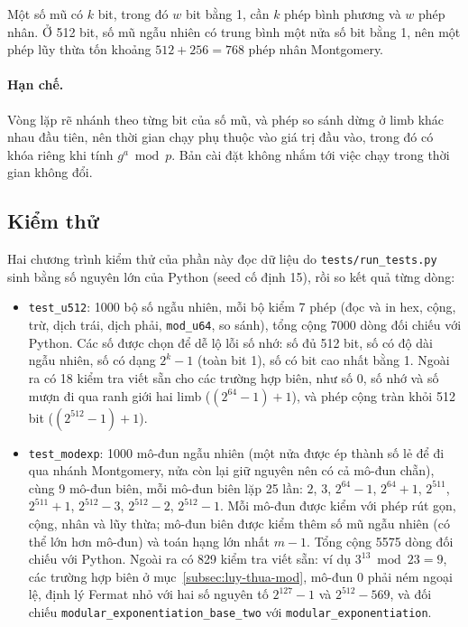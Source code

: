 Một số mũ có $k$ bit, trong đó $w$ bit bằng 1, cần $k$ phép bình phương và $w$ phép nhân. Ở 512 bit, số mũ ngẫu nhiên có trung bình một nửa số bit bằng 1, nên một phép lũy thừa tốn khoảng $512 + 256 = 768$ phép nhân Montgomery.

\paragraph{Hạn chế.} Vòng lặp rẽ nhánh theo từng bit của số mũ, và phép so sánh dừng ở limb khác nhau đầu tiên, nên thời gian chạy phụ thuộc vào giá trị đầu vào, trong đó có khóa riêng khi tính $g^a \bmod p$. Bản cài đặt không nhắm tới việc chạy trong thời gian không đổi.

\subsection{Kiểm thử}
\label{subsec:kiem-thu-so-lon}

Hai chương trình kiểm thử của phần này đọc dữ liệu do \texttt{tests/run\_tests.py} sinh bằng số nguyên lớn của Python (seed cố định 15), rồi so kết quả từng dòng:
\begin{itemize}
    \item \texttt{test\_u512}: 1000 bộ số ngẫu nhiên, mỗi bộ kiểm 7 phép (đọc và in hex, cộng, trừ, dịch trái, dịch phải, \texttt{mod\_u64}, so sánh), tổng cộng 7000 dòng đối chiếu với Python. Các số được chọn để dễ lộ lỗi số nhớ: số đủ 512 bit, số có độ dài ngẫu nhiên, số có dạng $2^k - 1$ (toàn bit 1), số có bit cao nhất bằng 1. Ngoài ra có 18 kiểm tra viết sẵn cho các trường hợp biên, như số 0, số nhớ và số mượn đi qua ranh giới hai limb ($(2^{64} - 1) + 1$), và phép cộng tràn khỏi 512 bit ($(2^{512} - 1) + 1$).
    \item \texttt{test\_modexp}: 1000 mô-đun ngẫu nhiên (một nửa được ép thành số lẻ để đi qua nhánh Montgomery, nửa còn lại giữ nguyên nên có cả mô-đun chẵn), cùng 9 mô-đun biên, mỗi mô-đun biên lặp 25 lần: $2$, $3$, $2^{64} - 1$, $2^{64} + 1$, $2^{511}$, $2^{511} + 1$, $2^{512} - 3$, $2^{512} - 2$, $2^{512} - 1$. Mỗi mô-đun được kiểm với phép rút gọn, cộng, nhân và lũy thừa; mô-đun biên được kiểm thêm số mũ ngẫu nhiên (có thể lớn hơn mô-đun) và toán hạng lớn nhất $m - 1$. Tổng cộng 5575 dòng đối chiếu với Python. Ngoài ra có 829 kiểm tra viết sẵn: ví dụ $3^{13} \bmod 23 = 9$, các trường hợp biên ở mục~\ref{subsec:luy-thua-mod}, mô-đun 0 phải ném ngoại lệ, định lý Fermat nhỏ với hai số nguyên tố $2^{127} - 1$ và $2^{512} - 569$, và đối chiếu \texttt{modular\_\allowbreak{}exponentiation\_\allowbreak{}base\_\allowbreak{}two} với \texttt{modular\_exponentiation}.
\end{itemize}

